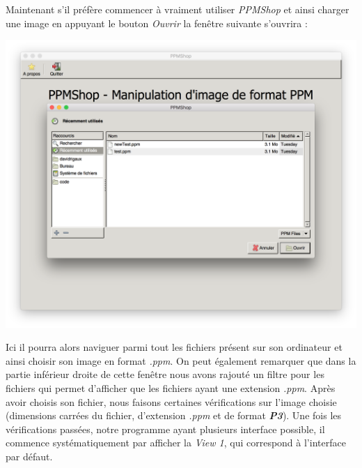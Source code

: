 \documentclass[12pt]{article}
\begin{document}
Maintenant s'il préfère commencer à vraiment utiliser \textit{PPMShop} et ainsi charger une image en appuyant le bouton \textit{Ouvrir} la fenêtre suivante s'ouvrira : 

\begin{center}
\includegraphics[scale = 0.4]{loadScreen}\\
\end{center}

Ici il pourra alors naviguer parmi tout les fichiers présent sur son ordinateur et ainsi choisir son image en format \textit{.ppm}. On peut également remarquer que dans la partie inférieur droite de cette fenêtre nous avons rajouté un filtre pour les fichiers qui permet d'afficher que les fichiers ayant une extension \textit{.ppm}.
Après avoir choisis son fichier, nous faisons certaines vérifications sur l'image choisie (dimensions carrées du fichier, d'extension \textit{.ppm} et de format \textit{\textbf{P3}}). Une fois les vérifications passées, notre programme ayant plusieurs interface possible, il commence systématiquement par afficher la \textit{View 1}, qui correspond à l'interface par défaut.
\end{document}
